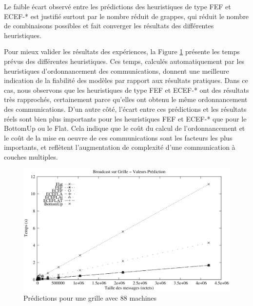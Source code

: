 Le faible écart observé entre les prédictions des heuristiques de
type FEF et ECEF-{*} est justifié surtout par le nombre réduit de
grappes, qui réduit le nombre de combinaisons possibles et fait converger
les résultats des différentes heuristiques. 

Pour mieux valider les résultats des expériences, la Figure \ref{Figure: Bcast case 1 predictions}
présente les temps prévus des différentes heuristiques. Ces temps,
calculés automatiquement par les heuristiques d'ordonnancement des
communications, donnent une meilleure indication de la fiabilité des
modèles par rapport aux résultats pratiques. Dans ce cas, nous observons
que les heuristiques de type FEF et ECEF-{*} ont des résultats très
rapprochés, certainement parce qu'elles ont obtenu le même ordonnancement
des communications. D'un autre côté, l'écart entre ces prédictions
et les résultats réels sont bien plus importants pour les heuristiques
FEF et ECEF-{*} que pour le BottomUp ou le Flat. Cela indique que
le coût du calcul de l'ordonnancement et le coût de la mise en oeuvre
de ces communications sont les facteurs les plus importants, et reflètent
l'augmentation de complexité d'une communication à couches multiples.

%
\begin{figure}[h]
	\begin{centering}
		\includegraphics[width=0.8\linewidth]{images/Grid/Bcast/case1/simul}
		\par\end{centering}
	
	\caption{\label{Figure: Bcast case 1 predictions}Prédictions pour une grille
		avec 88 machines}
	
\end{figure}


